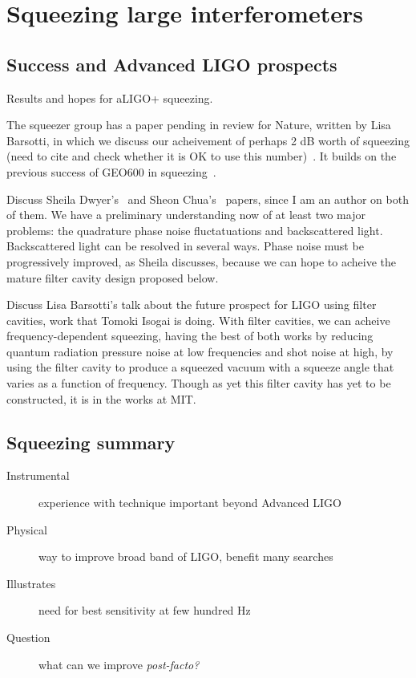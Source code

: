 \section{Squeezing large interferometers}

        \subsection{Success and Advanced LIGO prospects}
        \label{squeezing_success}
            Results and hopes for aLIGO+ squeezing.

	    The squeezer group has a paper pending in review for Nature, written by Lisa Barsotti, in which we discuss our acheivement of perhaps 2 dB worth of squeezing (need to cite and check whether it is OK to use this number)~\cite{BarsottiNatureSqueezing}. It builds on the previous success of GEO600 in squeezing~\cite{GEO600NatureSqueezing}.

	    Discuss Sheila Dwyer's~\cite{DwyerPhaseNoise} and Sheon Chua's~\cite{ChuaBackscatteredLight} papers, since I am an author on both of them. We have a preliminary understanding now of at least two major problems: the quadrature phase noise fluctatuations and backscattered light. Backscattered light can be resolved in several ways. Phase noise must be progressively improved, as Sheila discusses, because we can hope to acheive the mature filter cavity design proposed below.

Discuss Lisa Barsotti's talk about the future prospect for LIGO using filter cavities, work that Tomoki Isogai is doing. With filter cavities, we can acheive frequency-dependent squeezing, having the best of both works by reducing quantum radiation pressure noise at low frequencies and shot noise at high, by using the filter cavity to produce a squeezed vacuum with a squeeze angle that varies as a function of frequency. Though as yet this filter cavity has yet to be constructed, it is in the works at MIT.






\subsection{Squeezing summary}

\begin{description}
\item [{Instrumental}] experience with technique important beyond Advanced
LIGO
\item [{Physical}] way to improve broad band of LIGO, benefit many searches
\item [{Illustrates}] need for best sensitivity at few hundred Hz
\item [{Question}] what can we improve \emph{post-facto?}
\end{description}


